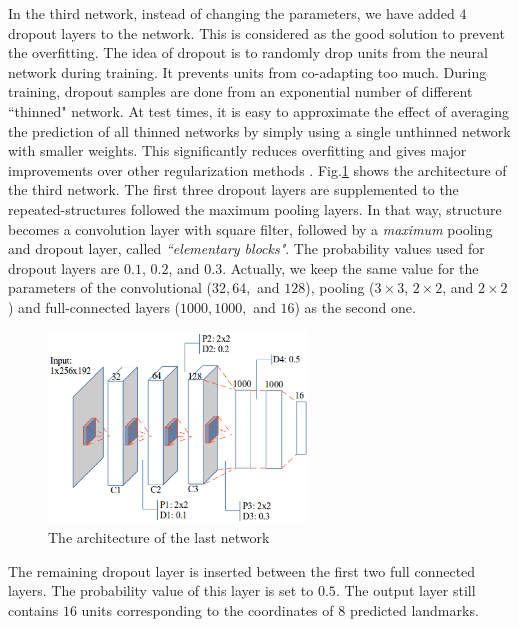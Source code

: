 \documentclass{article} %
\begin{document}
\begin{multicols}{2}
In the third network, instead of changing the parameters, we have added $4$ dropout layers to the network. This is considered as the good solution to prevent the overfitting. The idea of dropout is to randomly drop units from the neural network during training. It prevents units from co-adapting too much. During training, dropout samples are done from an exponential number of different ``thinned" network. At test times, it is easy to approximate the effect of averaging the prediction of all thinned networks by simply using a single unthinned network with smaller weights. This significantly reduces overfitting and gives major improvements over other regularization methods \cite{srivastava2014dropout}. Fig.\ref{figarch} shows the architecture of the third network. The first three dropout layers are supplemented to the repeated-structures followed the maximum pooling layers. In that way, structure becomes a convolution layer with square filter, followed by a \textit{maximum} pooling and dropout layer, called \textit{``elementary blocks"}. The probability values used for dropout layers are $0.1$, $0.2$, and $0.3$. Actually, we keep the same value for the parameters of the convolutional ($32, 64,$ and $128$), pooling ($3 \times 3$, $2 \times 2$, and $2 \times 2$) and full-connected layers ($1000, 1000,$ and $16$) as the second one.

\begin{figure}[H]
	\centerline{\includegraphics[height=2in]{images/architecture3.eps}}
	\caption{The architecture of the last network}
	\label{figarch}
\end{figure}

The remaining dropout layer is inserted between the first two full connected layers. The probability value of this layer is set to $0.5$. The output layer still contains $16$ units corresponding to the coordinates of $8$ predicted landmarks.


\end{multicols}
\end{document}
